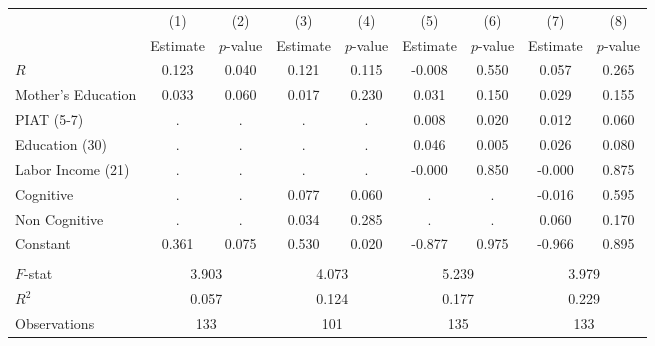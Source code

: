 \begin{tabular}{lcccccccc} \toprule
 & (1) & (2) & (3) & (4) & (5) & (6) & (7) & (8) \\ 
 & Estimate  & $p$-value  & Estimate  & $p$-value  & Estimate  & $p$-value  & Estimate  & $p$-value  \\  \midrule
$R$ &     0.123 &     0.040 &     0.121 &     0.115 &    -0.008 &     0.550 &     0.057 &     0.265 \\  
Mother's Education &     0.033 &     0.060 &     0.017 &     0.230 &     0.031 &     0.150 &     0.029 &     0.155 \\  
PIAT (5-7) &         . &         . &         . &         . &     0.008 &     0.020 &     0.012 &     0.060 \\  
Education (30) &         . &         . &         . &         . &     0.046 &     0.005 &     0.026 &     0.080 \\  
Labor Income (21) &         . &         . &         . &         . &    -0.000 &     0.850 &    -0.000 &     0.875 \\  
Cognitive &         . &         . &     0.077 &     0.060 &         . &         . &    -0.016 &     0.595 \\  
Non Cognitive &         . &         . &     0.034 &     0.285 &         . &         . &     0.060 &     0.170 \\  
Constant &     0.361 &     0.075 &     0.530 &     0.020 &    -0.877 &     0.975 &    -0.966 &     0.895 \\  \\ \midrule
$F$-stat &     \multicolumn{2}{c}{3.903} &              \multicolumn{2}{c}{4.073} &              \multicolumn{2}{c}{5.239} &              \multicolumn{2}{c}{3.979}           \\  
$R^2$ &     \multicolumn{2}{c}{0.057} &              \multicolumn{2}{c}{0.124} &              \multicolumn{2}{c}{0.177} &              \multicolumn{2}{c}{0.229}           \\  
Observations &   \multicolumn{2}{c}{133} &            \multicolumn{2}{c}{101} &          \multicolumn{2}{c}{135} &            \multicolumn{2}{c}{133}           \\  \bottomrule \end{tabular}
